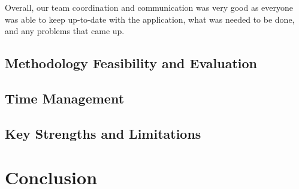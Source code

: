\documentclass{article}
\begin{document}
    Overall, our team coordination and communication was very good as everyone was able to keep up-to-date with the application, what was needed to be done, and any problems that came up.

    \subsection{Methodology Feasibility and Evaluation}

    \subsection{Time Management}

    \subsection{Key Strengths and Limitations}

\section{Conclusion}
\end{document}
